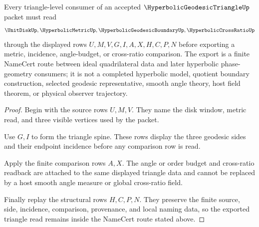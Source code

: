 \begin{theorem}
\label{thm:hyperbolic-geodesic-triangle-finite-readback}
Every triangle-level consumer of an accepted $\HyperbolicGeodesicTriangleUp$ packet must read
$$
\UnitDiskUp,\HyperbolicMetricUp,\HyperbolicGeodesicBoundaryUp,\HyperbolicCrossRatioUp
$$
through the displayed rows $U,M,V,G,I,A,X,H,C,P,N$ before exporting a metric, incidence, angle-budget, or cross-ratio comparison. The export is a finite NameCert route between ideal quadrilateral data and later hyperbolic phase-geometry consumers; it is not a completed hyperbolic model, quotient boundary construction, selected geodesic representative, smooth angle theory, host field theorem, or physical observer trajectory.
\end{theorem}
\begin{proof}
Begin with the source rows $U,M,V$. They name the disk window, metric read, and three visible vertices used by the packet.

Use $G,I$ to form the triangle spine. These rows display the three geodesic sides and their endpoint incidence before any comparison row is read.

Apply the finite comparison rows $A,X$. The angle or order budget and cross-ratio readback are attached to the same displayed triangle data and cannot be replaced by a host smooth angle measure or global cross-ratio field.

Finally replay the structural rows $H,C,P,N$. They preserve the finite source, side, incidence, comparison, provenance, and local naming data, so the exported triangle read remains inside the NameCert route stated above.
\end{proof}



